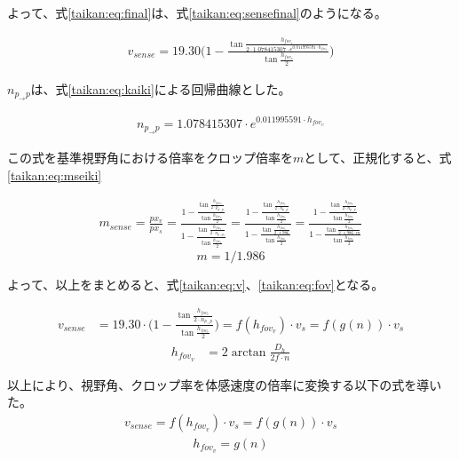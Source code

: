 よって、式\eqref{taikan:eq:final}は、式\eqref{taikan:eq:sensefinal}のようになる。

\begin{align}
  v_{sense} = 19.30\Bigg(1-\frac{\tan\frac{h_{fov_v}}{2\cdot 1.078415307\cdot e^{0.011995591\cdot h_{fov_v}}}}{\tan\frac{h_{fov_v}}{2}}\Bigg) \label{taikan:eq:sensefinal}
\end{align}

$n_{p_{\to}p}$は、式\eqref{taikan:eq:kaiki}による回帰曲線とした。

\begin{align}
  n_{p_{\to}p} = 1.078415307\cdot e^{0.011995591\cdot h_{fov_v}} \label{taikan:eq:kaiki}
\end{align}

この式を基準視野角における倍率をクロップ倍率を$m$として、正規化すると、式\eqref{taikan:eq:mseiki}

\begin{align}
  m_{sense} = \frac{px_v}{px_s} = \frac{1-\frac{\tan\frac{h_{fov_v}}{2\cdot p_{p_{\to}p}}}{\tan\frac{h_{fov_v}}{2}}}{1-\frac{\tan\frac{h_{fov_s}}{2\cdot n_{p_{\to}p_s}}}{\tan\frac{h_{fov_s}}{2}}} = \frac{1-\frac{\tan\frac{h_{fov_v}}{2\cdot n_{p_{\to}p}}}{\tan\frac{h_{fov_s}}{2}}}{1-\frac{\tan\frac{h_{fov_s}}{2\cdot 1.986}}{\tan\frac{h_{fov_s}}{2}}} = \frac{1-\frac{\tan\frac{h_{fov_v}}{2\cdot n_{p_{\to}p}}}{\tan\frac{h_{fov_v}}{2}}}{1-\frac{\tan\frac{h_{fov_s}}{2\cdot 1.986\cdot m}}{\tan\frac{h_{fov_s}}{2}}} \label{taikan:eq:mseiki}
\end{align}
$$m=1/1.986$$

よって、以上をまとめると、式\eqref{taikan:eq:v}、\eqref{taikan:eq:fov}となる。

\begin{align}
  v_{sense} &= 19.30\cdot\Bigg(1-\frac{\tan\frac{h_{fov_v}}{2\cdot n_{p_{\to}p}}}{\tan\frac{h_{fov_v}}{2}}\Bigg) = f(h_{fov_v})\cdot v_s = f(g(n))\cdot v_s \label{taikan:eq:v}
\end{align}
\begin{align}
  h_{fov_v} &= 2\arctan\frac{D_h}{2f\cdot n} \label{taikan:eq:fov}
\end{align}

以上により、視野角、クロップ率を体感速度の倍率に変換する以下の式を導いた。
\begin{align*}
  v_{sense} = f(h_{fov_v})\cdot v_s = f(g(n))\cdot v_s
\end{align*}
\begin{align*}
  h_{fov_v} = g(n)
\end{align*}

